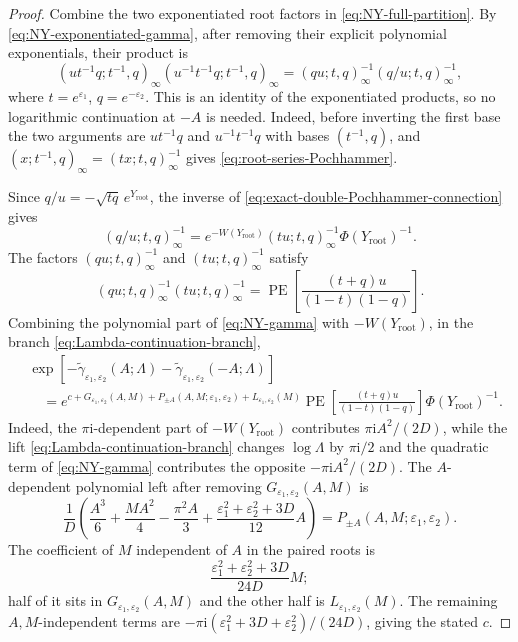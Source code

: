 \documentclass{amsart}
\theoremstyle{definition}
\numberwithin{equation}{section}
\newcommand{\PE}{\operatorname{PE}}
\newcommand{\eps}{\varepsilon}
\begin{document}
\begin{proof}
Combine the two exponentiated root factors in \eqref{eq:NY-full-partition}.  By \eqref{eq:NY-exponentiated-gamma}, after removing their explicit polynomial exponentials, their product is
\begin{equation}
 (ut^{-1}q;t^{-1},q)_\infty
 (u^{-1}t^{-1}q;t^{-1},q)_\infty
 =(qu;t,q)_\infty^{-1}(q/u;t,q)_\infty^{-1},
\label{eq:root-series-Pochhammer}
\end{equation}
where \(t=e^{\eps_1}\), \(q=e^{-\eps_2}\).  This is an identity of the exponentiated products, so no logarithmic continuation at \(-A\) is needed.
Indeed, before inverting the first base the two arguments are \(ut^{-1}q\) and \(u^{-1}t^{-1}q\) with bases \((t^{-1},q)\), and \((x;t^{-1},q)_\infty=(tx;t,q)_\infty^{-1}\) gives \eqref{eq:root-series-Pochhammer}.

Since \(q/u=-\sqrt{tq}\,e^{Y_{\mathrm{root}}}\), the inverse of \eqref{eq:exact-double-Pochhammer-connection} gives
\begin{equation}
 (q/u;t,q)_\infty^{-1}
 =e^{-W(Y_{\mathrm{root}})}(tu;t,q)_\infty^{-1}
  \Phi(Y_{\mathrm{root}})^{-1}.
\label{eq:root-outgoing-connection}
\end{equation}
The factors \((qu;t,q)_\infty^{-1}\) and \((tu;t,q)_\infty^{-1}\) satisfy
\begin{equation}
 (qu;t,q)_\infty^{-1}(tu;t,q)_\infty^{-1}
 =\PE\left[\frac{(t+q)u}{(1-t)(1-q)}\right].
\label{eq:root-one-leg-products}
\end{equation}
Combining the polynomial part of \eqref{eq:NY-gamma} with \(-W(Y_{\mathrm{root}})\), in the branch \eqref{eq:Lambda-continuation-branch},
\begin{equation}
\begin{aligned}
 &\exp[-\widetilde\gamma_{\eps_1,\eps_2}(A;\Lambda)
       -\widetilde\gamma_{\eps_1,\eps_2}(-A;\Lambda)]\\
 &\quad={}
 e^{c+G_{\eps_1,\eps_2}(A,M)+P_{\pm A}(A,M;\eps_1,\eps_2)
       +L_{\eps_1,\eps_2}(M)}
 \PE\left[
  \frac{(t+q)u}{(1-t)(1-q)}\right]
 \Phi(Y_{\mathrm{root}})^{-1}.
\end{aligned}
\label{eq:root-continuation}
\end{equation}
Indeed, the \(\pi\mathrm{i}\)-dependent part of \(-W(Y_{\mathrm{root}})\) contributes \(\pi\mathrm{i}A^2/(2D)\), while the lift \eqref{eq:Lambda-continuation-branch} changes \(\log\Lambda\) by \(\pi\mathrm{i}/2\) and the quadratic term of \eqref{eq:NY-gamma} contributes the opposite \(-\pi\mathrm{i}A^2/(2D)\).  The \(A\)-dependent polynomial left after removing \(G_{\eps_1,\eps_2}(A,M)\) is
\[
 \frac1D\left(
  \frac{A^3}{6}+\frac{MA^2}{4}-\frac{\pi^2A}{3}
  +\frac{\eps_1^2+\eps_2^2+3D}{12}A\right)
 =P_{\pm A}(A,M;\eps_1,\eps_2).
\]
The coefficient of \(M\) independent of \(A\) in the paired roots is
\[
 \frac{\eps_1^2+\eps_2^2+3D}{24D}M;
\]
half of it sits in \(G_{\eps_1,\eps_2}(A,M)\) and the other half is \(L_{\eps_1,\eps_2}(M)\).  The remaining \(A,M\)-independent terms are
\(-\pi\mathrm{i}(\eps_1^2+3D+\eps_2^2)/(24D)\), giving the stated \(c\).


\end{proof}
\end{document}
